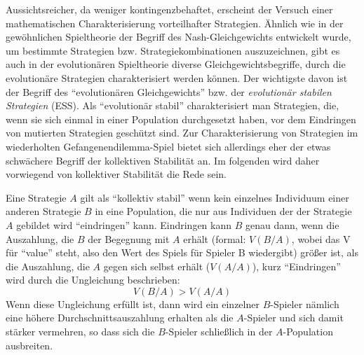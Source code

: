 Aussichtsreicher, da weniger kontingenzbehaftet, erscheint der Versuch einer
mathematischen Charakterisierung vorteilhafter Strategien. Ähnlich wie in der
gewöhnlichen Spieltheorie der Begriff des Nash-Gleichgewichts entwickelt wurde,
um bestimmte Strategien bzw. Strategiekombinationen auszuzeichnen, gibt es auch
in der evolutionären Spieltheorie diverse Gleichgewichtsbegriffe, durch die
evolutionäre Strategien charakterisiert werden können. Der wichtigste davon ist
der Begriff des "`evolutionären Gleichgewichts"' bzw. der {\em evolutionär
stabilen Strategien} (ESS). Als "`evolutionär stabil"' charakterisiert man
Strategien, die, wenn sie sich einmal in einer Population durchgesetzt haben,
vor dem Eindringen von mutierten Strategien geschützt sind. Zur
Charakterisierung von Strategien im wiederholten Gefangenendilemma-Spiel bietet
sich allerdings eher der etwas schwächere Begriff der 
kollektiven Stabilität an. Im folgenden wird daher vorwiegend von kollektiver
Stabilität die Rede sein.

Eine Strategie $A$ gilt als "`kollektiv stabil"' wenn kein einzelnes Individuum
einer anderen Strategie $B$ in eine Population, die nur aus Individuen der
der Strategie $A$ gebildet wird "`eindringen"' kann. Eindringen kann $B$ genau
dann, wenn die Auszahlung, die $B$ der Begegnung mit $A$ erhält (formal:
$V(B/A)$, wobei das V für "`value"' steht, also den Wert des Spiels für Spieler
B wiedergibt) größer ist, als die Auszahlung, die $A$ gegen sich selbst erhält
($V(A/A)$), kurz "`Eindringen"' wird durch die Ungleichung beschrieben:
\[ V(B/A) > V(A/A) \] 
Wenn diese Ungleichung erfüllt ist, dann wird ein einzelner $B$-Spieler nämlich
eine höhere Durchschnittsauszahlung erhalten als die $A$-Spieler und sich
damit stärker vermehren, so dass sich die $B$-Spieler schließlich in der
$A$-Population ausbreiten.

